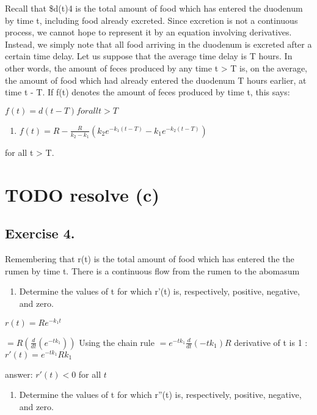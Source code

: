\documentclass[]{article}
\providecommand{\tightlist}{%
  \setlength{\itemsep}{0pt}\setlength{\parskip}{0pt}}
\begin{document}
Recall that \$d(t)4 is the total amount of food which has entered the
duodenum by time t, including food already excreted. Since excretion is
not a continuous process, we cannot hope to represent it by an equation
involving derivatives. Instead, we simply note that all food arriving in
the duodenum is excreted after a certain time delay. Let us suppose that
the average time delay is T hours. In other words, the amount of feces
produced by any time t \textgreater{} T is, on the average, the amount
of food which had already entered the duodenum T hours earlier, at time
t - T. If f(t) denotes the amount of feces produced by time t, this
says:

\(f(t) = d(t-T) for all t > T\)

\begin{enumerate}
\def\labelenumi{(\arabic{enumi})}
\setcounter{enumi}{9}
\tightlist
\item
  \(f(t) = R - \frac{R}{k_2-k_1}(k_2e^{-k_1(t-T)}-k_1e^{-k_2(t-T)})\)
\end{enumerate}

for all t \textgreater{} T.

\section{TODO resolve (c)}\label{todo-resolve-c}

\subsection{Exercise 4.}\label{exercise-4.}

Remembering that r(t) is the total amount of food which has entered the
the rumen by time t. There is a continuous flow from the rumen to the
abomasum

\begin{enumerate}
\def\labelenumi{(\alph{enumi})}
\tightlist
\item
  Determine the values of t for which r'(t) is, respectively, positive,
  negative, and zero.
\end{enumerate}

\(r(t) = Re^{-k_1t}\)

\(= R(\frac{d}{dt}(e^{-tk_1}))\) Using the chain rule
\(= e^{-tk_1}\frac{d}{dt}(-tk_1)R\) derivative of t is 1 :
\(r'(t)= e^{-tk_1}Rk_1\)

answer: \(r'(t) < 0\) for all \(t\)

\begin{enumerate}
\def\labelenumi{(\alph{enumi})}
\setcounter{enumi}{1}
\tightlist
\item
  Determine the values of t for which r''(t) is, respectively, positive,
  negative, and zero.
\end{enumerate}
\end{document}
